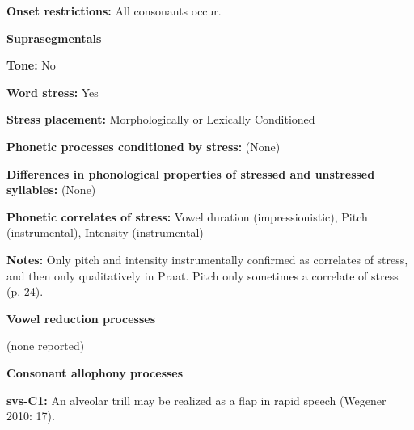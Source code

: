 \begin{styleBody}
\textbf{Onset restrictions:} All consonants occur.
\end{styleBody}

\begin{styleBody}
\textbf{Suprasegmentals}
\end{styleBody}

\begin{styleBody}
\textbf{Tone:} No
\end{styleBody}

\begin{styleBody}
\textbf{Word stress:} Yes
\end{styleBody}

\begin{styleBody}
\textbf{Stress placement:} Morphologically or Lexically Conditioned
\end{styleBody}

\begin{styleBody}
\textbf{Phonetic processes conditioned by stress:} (None)
\end{styleBody}

\begin{styleBody}
\textbf{Differences in phonological properties of stressed and unstressed syllables:} (None)
\end{styleBody}

\begin{styleBody}
\textbf{Phonetic correlates of stress: }Vowel duration (impressionistic), Pitch (instrumental), Intensity (instrumental)
\end{styleBody}

\begin{styleBody}
\textbf{Notes: }Only pitch and intensity instrumentally confirmed as correlates of stress, and then only qualitatively in Praat. Pitch only sometimes a correlate of stress (p. 24).
\end{styleBody}

\begin{styleBody}
\textbf{Vowel reduction processes}
\end{styleBody}

\begin{styleBody}
(none reported)
\end{styleBody}

\begin{styleBody}
\textbf{Consonant allophony processes}
\end{styleBody}

\begin{styleBody}
\textbf{svs-C1: }An alveolar trill may be realized as a flap in rapid speech (Wegener 2010: 17).
\end{styleBody}

